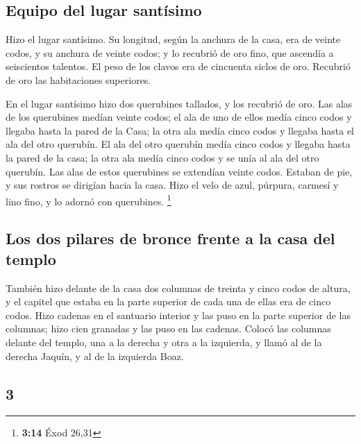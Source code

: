 \begin{paracol}{2}
\hypertarget{equipo-del-lugar-santuxedsimo}{%
\subsection{Equipo del lugar
santísimo}\label{equipo-del-lugar-santuxedsimo}}

 Hizo el lugar santísimo. Su longitud, según la anchura de
la casa, era de veinte codos, y su anchura de veinte codos; y lo
recubrió de oro fino, que ascendía a seiscientos talentos.
 El peso de los clavos era de cincuenta siclos de oro.
Recubrió de oro las habitaciones superiores.

 En el lugar santísimo hizo dos querubines tallados, y
los recubrió de oro.  Las alas de los querubines medían
veinte codos; el ala de uno de ellos medía cinco codos y llegaba hasta
la pared de la Casa; la otra ala medía cinco codos y llegaba hasta el
ala del otro querubín.  El ala del otro querubín medía
cinco codos y llegaba hasta la pared de la casa; la otra ala medía cinco
codos y se unía al ala del otro querubín.  Las alas de
estos querubines se extendían veinte codos. Estaban de pie, y sus
rostros se dirigían hacia la casa.  Hizo el velo de azul,
púrpura, carmesí y lino fino, y lo adornó con querubines. \footnote{\textbf{3:14}
  Éxod 26,31}

\hypertarget{los-dos-pilares-de-bronce-frente-a-la-casa-del-templo}{%
\subsection{Los dos pilares de bronce frente a la casa del
templo}\label{los-dos-pilares-de-bronce-frente-a-la-casa-del-templo}}

 También hizo delante de la casa dos columnas de treinta
y cinco codos de altura, y el capitel que estaba en la parte superior de
cada una de ellas era de cinco codos.  Hizo cadenas en el
santuario interior y las puso en la parte superior de las columnas; hizo
cien granadas y las puso en las cadenas.  Colocó las
columnas delante del templo, una a la derecha y otra a la izquierda, y
llamó al de la derecha Jaquín, y al de la izquierda Boaz.

\switchcolumn
\begin{otherlanguage}{english}

\hypertarget{section-5}{%
\section{3}\label{section-5}}


\end{otherlanguage}
\end{paracol}

